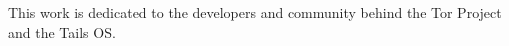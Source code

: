 

\begin{dedication}

This work is dedicated to the developers and community behind the Tor Project and the Tails OS.

\end{dedication}
